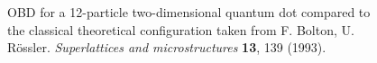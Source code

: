 \begin{frame}
 \begin{figure}
 \begin{center}
  \label{fig:wigner20}
  \caption{OBD for a 12-particle two-dimensional quantum dot compared to the classical theoretical configuration taken from F. Bolton, U. Rössler.  \textit{Superlattices and microstructures} \textbf{13}, 139 (1993).}
 \end{center}
\end{figure}
\end{frame}


